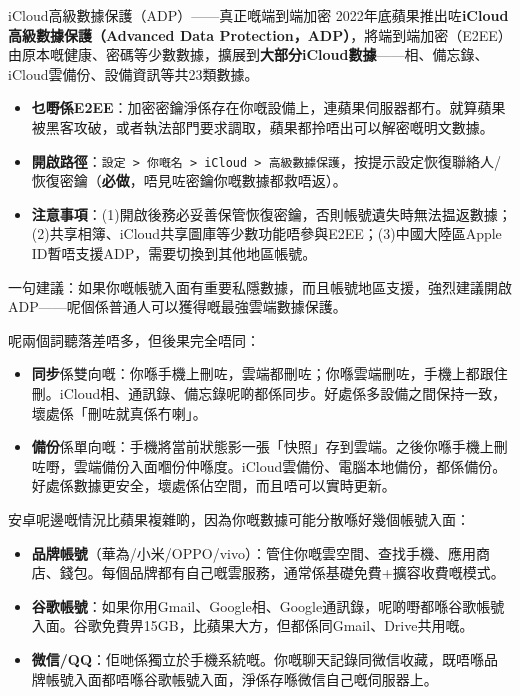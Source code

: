 \begin{tcbwarn}{iCloud高級數據保護（ADP）——真正嘅端到端加密}
2022年底蘋果推出咗\textbf{iCloud高級數據保護（Advanced Data Protection，ADP）}，將端到端加密（E2EE）由原本嘅健康、密碼等少數數據，擴展到\textbf{大部分iCloud數據}——相、備忘錄、iCloud雲備份、設備資訊等共23類數據。

\begin{itemize}
  \item \textbf{乜嘢係E2EE}：加密密鑰淨係存在你嘅設備上，連蘋果伺服器都冇。就算蘋果被黑客攻破，或者執法部門要求調取，蘋果都拎唔出可以解密嘅明文數據。
  \item \textbf{開啟路徑}：\texttt{設定 > 你嘅名 > iCloud > 高級數據保護}，按提示設定恢復聯絡人/恢復密鑰（\textbf{必做}，唔見咗密鑰你嘅數據都救唔返）。
  \item \textbf{注意事項}：(1)開啟後務必妥善保管恢復密鑰，否則帳號遺失時無法揾返數據；(2)共享相簿、iCloud共享圖庫等少數功能唔參與E2EE；(3)中國大陸區Apple ID暫唔支援ADP，需要切換到其他地區帳號。
\end{itemize}

一句建議：如果你嘅帳號入面有重要私隱數據，而且帳號地區支援，強烈建議開啟ADP——呢個係普通人可以獲得嘅最強雲端數據保護。

\end{tcbwarn}


呢兩個詞聽落差唔多，但後果完全唔同：

\begin{itemize}
  \item \textbf{同步}係雙向嘅：你喺手機上刪咗，雲端都刪咗；你喺雲端刪咗，手機上都跟住刪。iCloud相、通訊錄、備忘錄呢啲都係同步。好處係多設備之間保持一致，壞處係「刪咗就真係冇喇」。
  \item \textbf{備份}係單向嘅：手機將當前狀態影一張「快照」存到雲端。之後你喺手機上刪咗嘢，雲端備份入面嗰份仲喺度。iCloud雲備份、電腦本地備份，都係備份。好處係數據更安全，壞處係佔空間，而且唔可以實時更新。
\end{itemize}


安卓呢邊嘅情況比蘋果複雜啲，因為你嘅數據可能分散喺好幾個帳號入面：

\begin{itemize}
  \item \textbf{品牌帳號}（華為/小米/OPPO/vivo）：管住你嘅雲空間、查找手機、應用商店、錢包。每個品牌都有自己嘅雲服務，通常係基礎免費+擴容收費嘅模式。
  \item \textbf{谷歌帳號}：如果你用Gmail、Google相、Google通訊錄，呢啲嘢都喺谷歌帳號入面。谷歌免費畀15GB，比蘋果大方，但都係同Gmail、Drive共用嘅。
  \item \textbf{微信/QQ}：佢哋係獨立於手機系統嘅。你嘅聊天記錄同微信收藏，既唔喺品牌帳號入面都唔喺谷歌帳號入面，淨係存喺微信自己嘅伺服器上。
\end{itemize}

